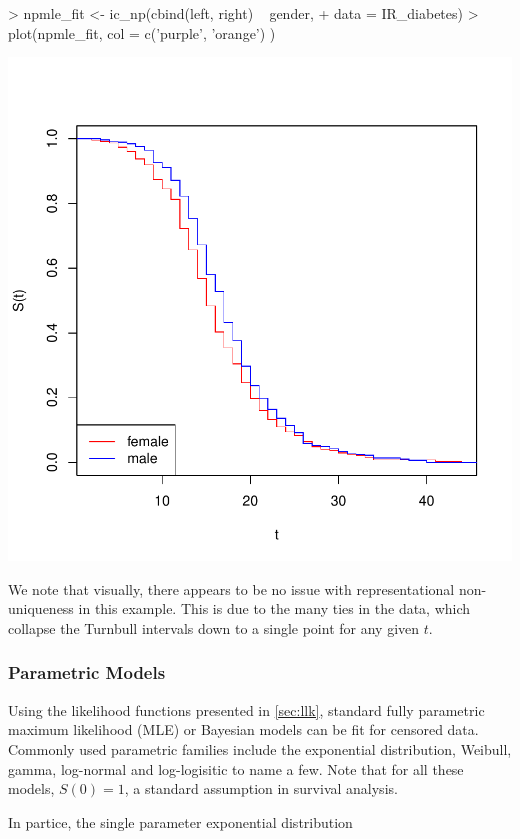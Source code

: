 \documentclass[a4paper]{article}
\begin{document}
\begin{Schunk}
\begin{Sinput}
> npmle_fit <- ic_np(cbind(left, right) ~ gender, 
+                    data = IR_diabetes)
> plot(npmle_fit, col = c('purple', 'orange') )
\end{Sinput}
\end{Schunk}
\includegraphics{StatisticalBackground-005}

We note that visually, there appears to be no issue with representational non-uniqueness in this example. This is due to the many ties in the data, which collapse the Turnbull intervals down to a single point for any given $t$. 

  \subsubsection{Parametric Models}

  Using the likelihood functions presented in \ref{sec:llk}, standard fully parametric maximum likelihood (MLE) or Bayesian models can be fit for censored data. Commonly used parametric families include the exponential distribution, Weibull, gamma, log-normal and log-logisitic to name a few. Note that for all these models, $S(0) = 1$, a standard assumption in survival analysis. 
  
  In partice, the single parameter exponential distribution 
\end{document}
